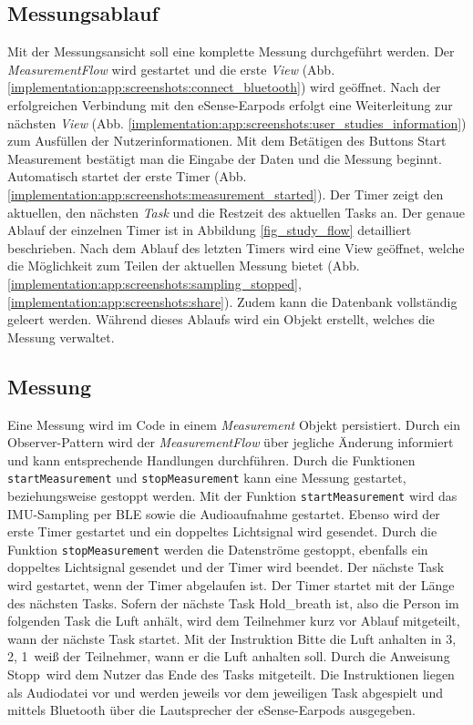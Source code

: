 \newpage
\subsection{Messungsablauf}
\label{ch:Implementierung:app:measurement_procedure}
Mit der Messungsansicht soll eine komplette Messung durchgeführt werden.
Der \textit{MeasurementFlow} wird gestartet und die erste \textit{View} (Abb. \ref{implementation:app:screenshots:connect_bluetooth}) wird geöffnet.
Nach der erfolgreichen Verbindung mit den eSense-Earpods erfolgt eine Weiterleitung zur nächsten \textit{View} (Abb. \ref{implementation:app:screenshots:user_studies_information}) zum Ausfüllen der Nutzerinformationen. 
Mit dem Betätigen des Buttons {\glqq Start Measurement\grqq} bestätigt man die Eingabe der Daten und die Messung beginnt.
Automatisch startet der erste Timer (Abb. \ref{implementation:app:screenshots:measurement_started}).
Der Timer zeigt den aktuellen, den nächsten \textit{Task} und die Restzeit des aktuellen Tasks an.
Der genaue Ablauf der einzelnen Timer ist in Abbildung \ref{fig_study_flow} detailliert beschrieben.
Nach dem Ablauf des letzten Timers wird eine View geöffnet, welche die Möglichkeit zum Teilen der aktuellen Messung bietet (Abb. \ref{implementation:app:screenshots:sampling_stopped}, \ref{implementation:app:screenshots:share}).
Zudem kann die Datenbank vollständig geleert werden.
Während dieses Ablaufs wird ein Objekt erstellt, welches die Messung verwaltet.

\subsection{Messung}
\label{ch:Implementierung:app:measurement}
Eine Messung wird im Code in einem \textit{Measurement} Objekt persistiert.
Durch ein Observer-Pattern wird der \textit{MeasurementFlow} über jegliche Änderung informiert und kann entsprechende Handlungen durchführen.
Durch die Funktionen \texttt{startMeasurement} und \texttt{stopMeasurement} kann eine Messung gestartet, beziehungsweise gestoppt werden.
Mit der Funktion \texttt{startMeasurement} wird das IMU-Sampling per BLE sowie die Audioaufnahme gestartet. 
Ebenso wird der erste Timer gestartet und ein doppeltes Lichtsignal wird gesendet. 
Durch die Funktion \texttt{stopMeasurement} werden die Datenströme gestoppt, ebenfalls ein doppeltes Lichtsignal gesendet und der Timer wird beendet.
Der nächste Task wird gestartet, wenn der Timer abgelaufen ist. Der Timer startet mit der Länge des nächsten Tasks.
Sofern der nächste Task {\glqq Hold\_breath\grqq} ist, also die Person im folgenden Task die Luft anhält, wird dem Teilnehmer kurz vor Ablauf mitgeteilt, wann der nächste Task startet.
Mit der Instruktion \glqq Bitte die Luft anhalten in 3, 2, 1\grqq \ weiß der Teilnehmer, wann er die Luft anhalten soll.
Durch die Anweisung \glqq Stopp\grqq \ wird dem Nutzer das Ende des Tasks mitgeteilt. 
Die Instruktionen liegen als Audiodatei vor und werden jeweils vor dem jeweiligen Task abgespielt und mittels Bluetooth über die Lautsprecher der eSense-Earpods ausgegeben.

